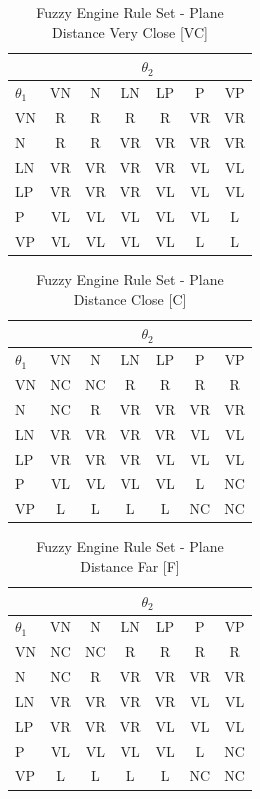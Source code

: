 \documentclass[10pt, conference, compsocconf]{IEEEtran}
\begin{document}
\begin{table}[position here!]
\centering
\caption{Fuzzy Engine Rule Set - Plane Distance Very Close [VC]}
\begin{tabular}{l | c c c c c c }
& \multicolumn{6}{c}{$\theta_2$} \\
\hline
\hline
$\theta_1$ & VN & N & LN & LP & P & VP \\
\hline
VN & R & R & R & R & VR & VR \\ 
N & R & R & VR & VR & VR & VR \\
LN & VR & VR & VR & VR & VL & VL\\
LP & VR & VR & VR & VL & VL & VL \\
P & VL & VL & VL & VL & VL & L \\
VP & VL & VL & VL & VL & L & L \\
\end{tabular}
\label{tab:vc}
\end{table}

\begin{table}[position here!]
\centering
\caption{Fuzzy Engine Rule Set - Plane Distance Close [C]}
\begin{tabular}{l | c c c c c c }
& \multicolumn{6}{c}{$\theta_2$} \\
\hline
\hline
$\theta_1$ & VN & N & LN & LP & P & VP \\
\hline
VN & NC & NC & R & R & R & R \\ 
N & NC & R & VR & VR & VR & VR \\
LN & VR & VR & VR & VR & VL & VL \\
LP & VR & VR & VR & VL & VL & VL \\
P & VL & VL & VL & VL & L & NC \\
VP & L & L & L & L & NC & NC \\
\end{tabular}
\label{tab:c}
\end{table}

\begin{table}[position here!]
\centering
\caption{Fuzzy Engine Rule Set - Plane Distance Far [F]}
\begin{tabular}{l | c c c c c c }
& \multicolumn{6}{c}{$\theta_2$} \\
\hline
\hline
$\theta_1$ & VN & N & LN & LP & P & VP \\
\hline
VN & NC & NC & R & R & R & R \\ 
N & NC & R & VR & VR & VR & VR \\
LN & VR & VR & VR & VR & VL & VL \\
LP & VR & VR & VR & VL & VL & VL \\
P & VL & VL & VL & VL & L & NC \\
VP & L & L & L & L & NC & NC \\
\end{tabular}
\label{tab:f}
\end{table}
\end{document}
